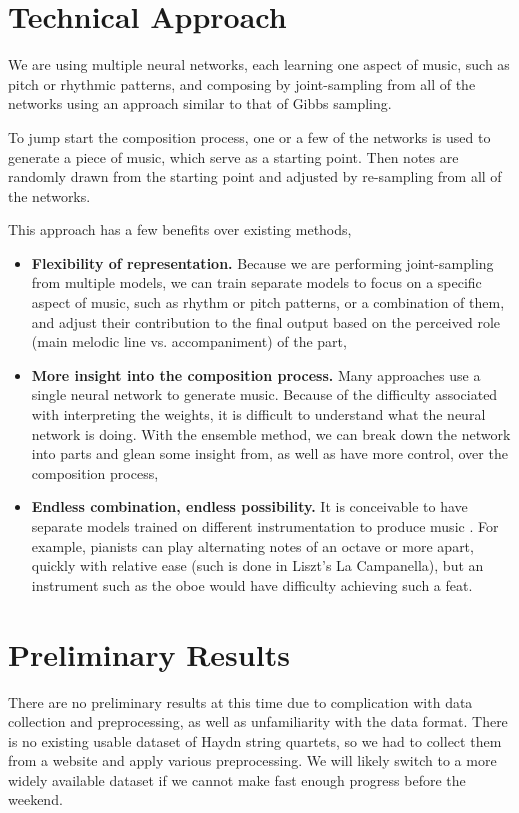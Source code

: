 \documentclass[10pt,twocolumn,letterpaper]{article}
\begin{document}
  \section{Technical Approach}
  We are using multiple neural networks, each learning one aspect of music, such as pitch or rhythmic patterns, and composing by joint-sampling from all of the networks using an approach similar to that of Gibbs sampling.

  To jump start the composition process, one or a few of the networks is used to generate a piece of music, which serve as a starting point. Then notes are randomly drawn from the starting point and adjusted by re-sampling from all of the networks.

  \vspace{4mm}
  This approach has a few benefits over existing methods,
  \begin{itemize}
    \item \textbf{Flexibility of representation.} Because we are performing joint-sampling from multiple models, we can train separate models to focus on a specific aspect of music, such as rhythm or pitch patterns, or a combination of them, and adjust their contribution to the final output based on the perceived role (main melodic line vs. accompaniment) of the part,
    \item \textbf{More insight into the composition process.} Many approaches use a single neural network to generate music. Because of the difficulty associated with interpreting the weights, it is difficult to understand what the neural network is doing. With the ensemble method, we can break down the network into parts and glean some insight from, as well as have more control, over the composition process,
    \item \textbf{Endless combination, endless possibility.} It is conceivable to have separate models trained on different instrumentation to produce music . For example, pianists can play alternating notes of an octave or more apart, quickly with relative ease (such is done in Liszt's La Campanella), but an instrument such as the oboe would have difficulty achieving such a feat.
  \end{itemize}

  \section{Preliminary Results}
  There are no preliminary results at this time due to complication with data collection and preprocessing, as well as unfamiliarity with the data format. There is no existing usable dataset of Haydn string quartets, so we had to collect them from a website and apply various preprocessing. We will likely switch to a more widely available dataset if we cannot make fast enough progress before the weekend.
\end{document}
